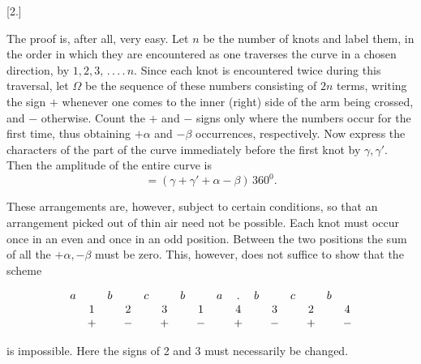 %
\begin{center}[2.]\end{center}

The proof is, after all, very easy. Let $n$ be the number of knots
and label them, in the order in which they are encountered as one
traverses the curve in a chosen direction, by
$1, 2, 3,\,.\,.\,.\,.\,n$. Since each knot is encountered twice during this traversal,
let $\Omega$ be the sequence of these numbers consisting of $2n$ terms,
writing the sign $+$ whenever one comes to the inner (right)
side of the arm being crossed, and $-$ otherwise. Count the $+$ and
$-$ signs only where the numbers occur for the first time,
thus obtaining $+\alpha$ and $-\beta$ occurrences, respectively. Now express the characters of the part
of the curve immediately before the first knot by $\gamma,
\gamma'$. Then the amplitude of the entire curve is
\[
= (\gamma+\gamma'+\alpha-\beta)\,360^0.
\]

These arrangements are, however, subject to certain conditions,
so that an arrangement picked out of thin air need not be possible. Each
knot must occur once in an even and once in an odd
position. Between the two positions the sum of all the
$+\alpha, -\beta$ must be zero. This, however, does not suffice to
show that the scheme

\[
\begin{array}{@{}*{16}{c}@{}}
a&&b&&c&&b&&a&.&b&&c&&b&\\
&1&&2&&3&&1&&4&&3&&2&&4\\
&+&&-&&+&&-&&+&&-&&+&&-
\end{array}
\]

is impossible. Here the signs of 2 and 3 must necessarily be
changed.

